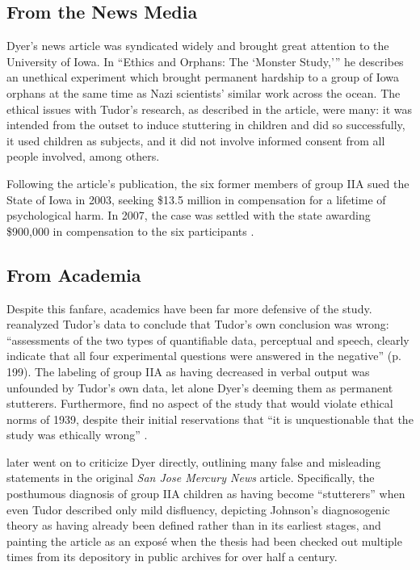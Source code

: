 \documentclass[american]{../../../coursework}
\begin{document}
\subsection{From the News Media}

Dyer's \parencite*{Dye01} news article was syndicated widely and brought great
attention to the University of Iowa. In ``Ethics and Orphans: The
`Monster Study,''' he describes an unethical experiment which brought
permanent hardship to a group of Iowa orphans at the same time as Nazi
scientists' similar work across the ocean. The ethical issues with
Tudor's research, as described in the article, were many: it was
intended from the outset to induce stuttering in children and did so
successfully, it used children as subjects, and it did not involve
informed consent from all people involved, among others.

Following the article's publication, the six former members of group IIA
sued the State of Iowa in 2003, seeking \$13.5 million in compensation
for a lifetime of psychological harm. In 2007, the case was settled with
the state awarding \$900,000 in compensation to the six participants
\parencite{BBC07}.

\subsection{From Academia}

Despite this fanfare, academics have been far more defensive of the
study. \textcite{Amb02} reanalyzed Tudor's data to conclude that
Tudor's own conclusion was wrong: ``assessments of the two types of
quantifiable data, perceptual and speech, clearly indicate that all four
experimental questions were answered in the negative'' (p. 199). The
labeling of group IIA as having decreased in verbal output was unfounded
by Tudor's own data, let alone Dyer's deeming them as permanent
stutterers. Furthermore, \textcite{Amb02} find no aspect of the
study that would violate ethical norms of 1939, despite their initial
reservations that ``it is unquestionable that the study was ethically
wrong'' \parencite[17]{Yai01}.

\textcite{GoldfarbEthics04} later went on to criticize Dyer directly, outlining many
false and misleading statements in the original \emph{San Jose Mercury
News} article. Specifically, the posthumous diagnosis of group IIA
children as having become ``stutterers'' when even Tudor described only
mild disfluency, depicting Johnson's diagnosogenic theory as having
already been defined rather than in its earliest stages, and painting
the article as an exposé when the thesis had been checked out multiple
times from its depository in public archives for over half a century.
\end{document}

